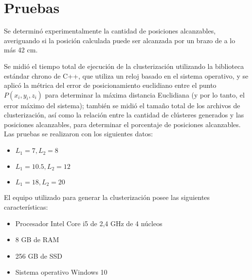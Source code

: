 \section{Pruebas}

Se determinó experimentalmente la cantidad de posiciones alcanzables, averiguando si la posición calculada puede ser alcanzada por un brazo de a lo más 42 cm.

Se midió el tiempo total de ejecución de la clusterización utilizando la biblioteca estándar chrono de C++, que utiliza un reloj basado en el sistema operativo, y se aplicó la métrica del error de posicionamiento euclidiano entre el punto $P(x_i, y_i, z_i)$ para determinar la máxima distancia Euclidiana (y por lo tanto, el error máximo del sistema); también se midió el tamaño total de los archivos de clusterización, así como la relación entre la cantidad de clústeres generados y las posiciones alcanzables, para determinar el porcentaje de posiciones alcanzables. Las pruebas se realizaron con los siguientes datos:

\begin{itemize}
	\item $L_1 = 7, L_2 = 8$
	\item $L_1 = 10.5, L_2 = 12$
	\item $L_1 = 18, L_2 = 20$
\end{itemize}

El equipo utilizado para generar la clusterización posee las siguientes características:

\begin{itemize}
	\item Procesador Intel Core i5 de 2,4 GHz de 4 núcleos
	\item 8 GB de RAM
	\item 256 GB de SSD
	\item Sistema operativo Windows 10
\end{itemize}

